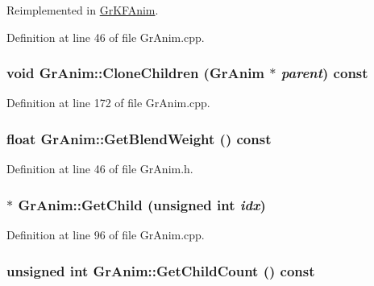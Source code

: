 Reimplemented in \hyperlink{class_gr_k_f_anim_5392ada1053eff8dcb27fa727e107f79}{GrKFAnim}.

Definition at line 46 of file GrAnim.cpp.\hypertarget{class_gr_anim_d83af685b7a05de92682293829ca5268}{
\subsubsection[{CloneChildren}]{\setlength{\rightskip}{0pt plus 5cm}void GrAnim::CloneChildren ({\bf GrAnim} $\ast$ {\em parent}) const}}
\label{class_gr_anim_d83af685b7a05de92682293829ca5268}




Definition at line 172 of file GrAnim.cpp.\hypertarget{class_gr_anim_f6af73be3d38c2ea62c5dac6a5d65196}{
\subsubsection[{GetBlendWeight}]{\setlength{\rightskip}{0pt plus 5cm}float GrAnim::GetBlendWeight () const}}
\label{class_gr_anim_f6af73be3d38c2ea62c5dac6a5d65196}




Definition at line 46 of file GrAnim.h.\hypertarget{class_gr_anim_db3b4e7c91b07cb1aa949ddfa4cb4211}{
\subsubsection[{GetChild}]{ $\ast$ GrAnim::GetChild (unsigned int {\em idx})}}
\label{class_gr_anim_db3b4e7c91b07cb1aa949ddfa4cb4211}




Definition at line 96 of file GrAnim.cpp.\hypertarget{class_gr_anim_8a6f16cd1038ce6d266986df04e6be63}{
\subsubsection[{GetChildCount}]{\setlength{\rightskip}{0pt plus 5cm}unsigned int GrAnim::GetChildCount () const}}
\label{class_gr_anim_8a6f16cd1038ce6d266986df04e6be63}




